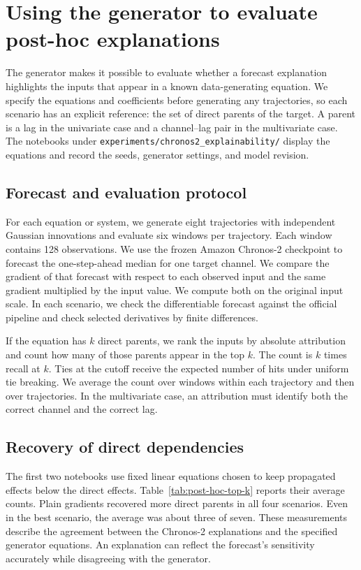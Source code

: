 \section{Using the generator to evaluate post-hoc explanations}
\label{sec:generator-post-hoc-explainability}

The generator makes it possible to evaluate whether a forecast explanation
highlights the inputs that appear in a known data-generating equation. We
specify the equations and coefficients before generating any trajectories, so
each scenario has an explicit reference: the set of direct parents of the
target. A parent is a lag in the univariate case and a channel--lag pair in
the multivariate case. The notebooks under
\texttt{experiments/chronos2\_explainability/} display the equations and record
the seeds, generator settings, and model revision.

\subsection{Forecast and evaluation protocol}

For each equation or system, we generate eight trajectories with independent
Gaussian innovations and evaluate six windows per trajectory. Each window
contains 128 observations. We use the frozen Amazon Chronos-2 checkpoint
\citep{ansari2025chronos2} to forecast the one-step-ahead median for one target
channel. We compare the gradient of that forecast with respect to each
observed input and the same gradient multiplied by the input value. We compute
both on the original input scale. In each scenario, we check the differentiable
forecast against the official pipeline and check selected derivatives by
finite differences.

If the equation has $k$ direct parents, we rank the inputs by absolute
attribution and count how many of those parents appear in the top $k$.
The count is $k$ times recall at $k$. Ties at the cutoff receive the expected
number of hits under uniform tie breaking. We average the count over windows
within each trajectory and then over trajectories. In the multivariate case,
an attribution must identify both the correct channel and the correct lag.

\subsection{Recovery of direct dependencies}

The first two notebooks use fixed linear equations chosen to keep propagated
effects below the direct effects. Table~\ref{tab:post-hoc-top-k} reports their
average counts. Plain gradients recovered more direct parents in all four
scenarios. Even in the best scenario, the average was about three of seven.
These measurements describe the agreement between the Chronos-2 explanations
and the specified generator equations. An explanation can reflect the
forecast's sensitivity accurately while disagreeing with the generator.

